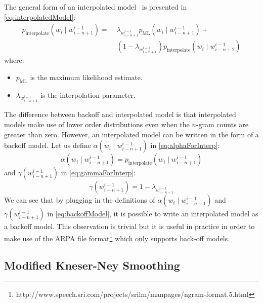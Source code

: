 The general form of an interpolated model~\citep{chen-goodman:1998:harvard} is
presented in \autoref{eq:interpolatedModel}:
%
\begin{equation}
  \begin{split}
    p_{\text{interpolate}}(w_i \mid w_{i - n + 1}^{i - 1}) = & \; \lambda_{w_{i - n + 1}^{i - 1}} p_{\text{ML}}(w_i \mid w_{i - n + 1}^{i - 1}) + \\
                                                             & \; (1 - \lambda_{w_{i - n + 1}^{i - 1}}) p_{\text{interpolate}}(w_i \mid w_{i - n + 2}^{i - 1})
  \end{split}
  \label{eq:interpolatedModel}
\end{equation}
%
where:
%
\begin{itemize}
  \item $p_{\text{ML}}$ is the maximum likelihood estimate.
  \item $\lambda_{w_{i - n + 1}^{i - 1}}$ is the interpolation parameter.
\end{itemize}
%
The difference between backoff and interpolated model is that interpolated
models make use of lower order distributions even when the $n$-gram counts are
greater than zero. However, an interpolated model can be written in the form
of a backoff model.
Let us define $\alpha(w_i \mid w_{i - n + 1}^{i - 1})$ in \autoref{eq:alphaForInterp}:
%
\begin{equation}
  \alpha(w_i \mid w_{i - n + 1}^{i - 1}) = p_{\text{interpolate}}(w_i \mid w_{i - n + 1}^{i - 1})
  \label{eq:alphaForInterp}
\end{equation}
%
and $\gamma(w_{i - n + 1}^{i - 1})$ in \autoref{eq:gammaForInterp}:
%
\begin{equation}
  \gamma(w_{i - n + 1}^{i - 1}) = 1 - \lambda_{w_{i - n + 1}^{i - 1}}
  \label{eq:gammaForInterp}
\end{equation}
%
We can see that by plugging in the definitions of
$\alpha(w_i \mid w_{i - n + 1}^{i - 1})$ and
$\gamma(w_{i - n + 1}^{i - 1})$ in \autoref{eq:backoffModel}, it is
possible to write an interpolated model as a backoff model.
This observation is trivial but it is useful in practice in order to make use of
the ARPA file
format\footnote{http://www.speech.sri.com/projects/srilm/manpages/ngram-format.5.html}
which only supports back-off models.

\subsection{Modified Kneser-Ney Smoothing}
\label{sec:StatisticalMachineTranslationKneserNey}

